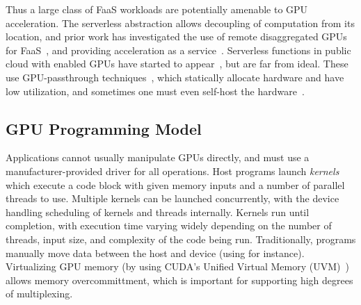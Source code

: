 Thus a large class of FaaS workloads are potentially amenable to GPU acceleration.
The serverless abstraction allows decoupling of computation from its location, and prior work has investigated the use of remote disaggregated GPUs for FaaS~\cite{naranjo2020accelerated,fingler2022dgsf}, and providing acceleration as a service~\cite{varghese2015acceleration,du2022serverless}.
Serverless functions in public cloud with enabled GPUs have started to appear~\cite{azure-gpu-function,alibaba-gpu-function}, but are far from ideal.
These use GPU-passthrough techniques~\cite{alibaba-gpu-noshare}, which statically allocate hardware and have low utilization, and sometimes one must even self-host the hardware~\cite{azure-gpu-function}.


\subsection{GPU Programming Model}

Applications cannot usually manipulate GPUs directly, and must use a manufacturer-provided driver for all operations.
Host programs launch \emph{kernels} which execute a code block with given memory inputs and a number of parallel threads to use.
Multiple kernels can be launched concurrently, with the device handling scheduling of kernels and threads internally.
Kernels run until completion, with execution time varying widely depending on the number of threads, input size, and complexity of the code being run. 
Traditionally, programs manually move data between the host and device (using  for instance).
Virtualizing GPU memory (by using CUDA's Unified Virtual Memory (UVM)~\cite{nvidia-uvm}) allows memory overcommittment, which is important for supporting high degrees of multiplexing.

